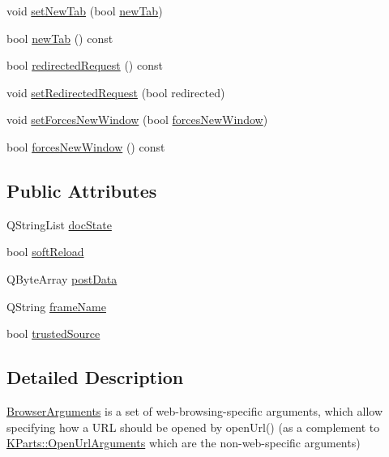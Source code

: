 \begin{DoxyCompactItemize}
\item 
void \hyperlink{structKParts_1_1BrowserArguments_a17bbf30d75c3e5c4d906b91b1c8eed3b}{set\+New\+Tab} (bool \hyperlink{structKParts_1_1BrowserArguments_acdc75a4b3726424aabb4958d58b6e586}{new\+Tab})
\item 
bool \hyperlink{structKParts_1_1BrowserArguments_acdc75a4b3726424aabb4958d58b6e586}{new\+Tab} () const 
\item 
bool \hyperlink{structKParts_1_1BrowserArguments_a3a3c15968b056a76248f483ea613740a}{redirected\+Request} () const 
\item 
void \hyperlink{structKParts_1_1BrowserArguments_a7169bd696dd783e0312f7bf220884e0e}{set\+Redirected\+Request} (bool redirected)
\item 
void \hyperlink{structKParts_1_1BrowserArguments_a0a0f93b431d62e60a9bb411f97be0126}{set\+Forces\+New\+Window} (bool \hyperlink{structKParts_1_1BrowserArguments_add9a79530ee4c265e8e37493d94f1f08}{forces\+New\+Window})
\item 
bool \hyperlink{structKParts_1_1BrowserArguments_add9a79530ee4c265e8e37493d94f1f08}{forces\+New\+Window} () const 
\end{DoxyCompactItemize}
\subsection*{Public Attributes}
\begin{DoxyCompactItemize}
\item 
Q\+String\+List \hyperlink{structKParts_1_1BrowserArguments_a76aed0d1e923b73db918038d23f524ec}{doc\+State}
\item 
bool \hyperlink{structKParts_1_1BrowserArguments_af06b08da058cd6fc19ad42e2904e2594}{soft\+Reload}
\item 
Q\+Byte\+Array \hyperlink{structKParts_1_1BrowserArguments_a9c1fb6cb602a10fec4ca05a25f1b9ac6}{post\+Data}
\item 
Q\+String \hyperlink{structKParts_1_1BrowserArguments_ad8b767db0ac78790860f4f0cbef64ea2}{frame\+Name}
\item 
bool \hyperlink{structKParts_1_1BrowserArguments_aa9e31eabaee6af2692319d21721fc9cb}{trusted\+Source}
\end{DoxyCompactItemize}


\subsection{Detailed Description}
\hyperlink{structKParts_1_1BrowserArguments}{Browser\+Arguments} is a set of web-\/browsing-\/specific arguments, which allow specifying how a U\+R\+L should be opened by open\+Url() (as a complement to \hyperlink{classKParts_1_1OpenUrlArguments}{K\+Parts\+::\+Open\+Url\+Arguments} which are the non-\/web-\/specific arguments)

